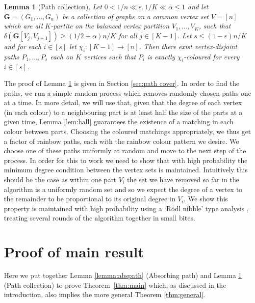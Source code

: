 \documentclass[11pt, dvipsnames]{amsart}
\theoremstyle{plain}
\newtheorem{lemma}[theo]{Lemma}
\theoremstyle{definition}
\newcommand{\eps}{\varepsilon}
\begin{document}
\begin{lemma}[Path collection] \label{lemma:pathcoll} 
Let $0<1/n \ll \eps,1/K  \ll \alpha \leq 1$ and let $\mathbf{G} = (G_1, \ldots, G_n)$ be a collection of graphs on a common vertex set $V=[n]$ which are all $K$-partite on the balanced vertex partition $V_1, \ldots, V_K$, such that $\delta(\mathbf{G}[V_j, V_{j+1}]) \geq (1/2 + \alpha)n/K$ for all $j \in [K-1]$. Let $s\le(1-\eps)n/K $ and for each $i \in [s]$ let $\chi_i: [K-1] \rightarrow [n]$. Then there exist vertex-disjoint paths $P_1, \ldots, P_s$ each on $K$ vertices such that $P_i$ is exactly $\chi_i$-coloured for every $i\in[s]$.
\end{lemma}

The proof of Lemma \ref{lemma:pathcoll} is given in Section \ref{sec:path cover}. In order to find the paths, we run a simple random process which removes randomly chosen paths one at a time.  In more detail, we will use that, given that the degree of each vertex (in each colour) to a neighbouring part is at least half the size of the parts at a given time, Lemma \ref{lem:hall} guarantees the existence of a matching in each colour between parts. Choosing the coloured matchings appropriately, we thus get a factor of rainbow paths, each with the rainbow colour pattern we desire. We choose one of these paths uniformly at random and move to the next step of the process. In order for this to work we need to show that with  high probability the minimum degree condition between the vertex sets is maintained. Intuitively this should be the case as within one part $V_i$ the set we have removed so far in the algorithm is a uniformly random set and so we expect the degree of a vertex to the remainder to be proportional to its original degree in $V_i$. We show this property is maintained with high probability using a `R\"odl nibble'  type analysis \cite{rodl1985packing}, treating several rounds of the algorithm together in small bites. 

\section{Proof of main result} \label{sec:mainproof}

Here we put together Lemma \ref{lemma:abspath} (Absorbing path) and Lemma \ref{lemma:pathcoll} (Path collection) to prove Theorem~\ref{thm:main} which, as discussed in the introduction, also implies the more general Theorem \ref{thm:general}.
\end{document}
